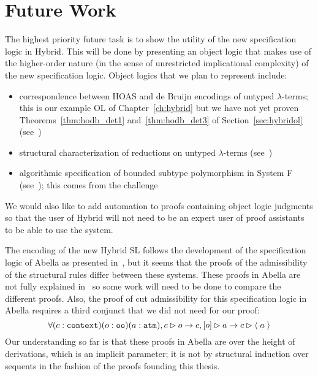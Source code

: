 \section{Future Work}

The highest priority future task is to show the utility of the new specification logic in Hybrid. This will be done by presenting an object logic that makes use of the higher-order nature (in the sense of unrestricted implicational complexity) of the new specification logic. Object logics that we plan to represent include:
\begin{itemize}
 \item correspondence between HOAS and de Bruijn encodings of untyped $\lambda$-terms; this is our example OL of Chapter~\ref{ch:hybrid} but we have not yet proven Theorems~\ref{thm:hodb_det1} and~\ref{thm:hodb_det3} of Section~\ref{sec:hybridol} (see~\cite{WCGN:PPDP13})
 \item structural characterization of reductions on untyped $\lambda$-terms (see~\cite{WCGN:PPDP13})
 \item algorithmic specification of bounded subtype polymorphism in System F (see~\cite{Pientka:TPHOLs07}); this comes from the \poplmark{} challenge~\cite{Aydemir05TPHOLs}
\end{itemize}
We would also like to add automation to proofs containing object logic judgments so that the user of Hybrid will not need to be an expert user of proof assistants to be able to use the system.

The encoding of the new Hybrid SL follows the development of the specification logic of Abella as presented in~\cite{WCGN:PPDP13}, but it seems that the proofs of the admissibility of the structural rules differ between these systems. These proofs in Abella are not fully explained in~\cite{WCGN:PPDP13} so some work will need to be done to compare the different proofs. Also, the proof of cut admissibility for this specification logic in Abella requires a third conjunct that we did not need for our proof:
$$
\forall (c : \sltm{context}) (o : \sltm{oo}) (a: \hybridtm{atm}),\\
\seqsl[c]{o} \rightarrow \bchsl[c]{o}{a} \rightarrow \seqsl[c]{\atom{a}}
$$
Our understanding so far is that these proofs in Abella are over the height of derivations, which is an implicit parameter; it is not by structural induction over sequents in the fashion of the proofs founding this thesis.